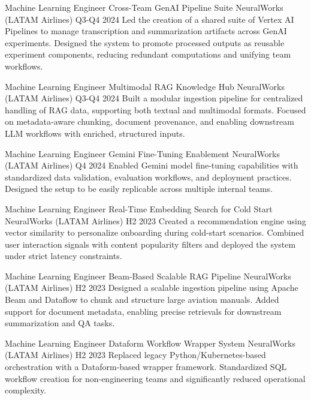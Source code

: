 \begin{cventries}


    \cventry
    {Machine Learning Engineer}
    {Cross-Team GenAI Pipeline Suite}
    {NeuralWorks (LATAM Airlines)}
    {Q3-Q4 2024}
    {Led the creation of a shared suite of Vertex AI Pipelines to manage transcription and summarization artifacts across GenAI experiments. Designed the system to promote processed outputs as reusable experiment components, reducing redundant computations and unifying team workflows.}

    \cventry
    {Machine Learning Engineer}
    {Multimodal RAG Knowledge Hub}
    {NeuralWorks (LATAM Airlines)}
    {Q3-Q4 2024}
    {Built a modular ingestion pipeline for centralized handling of RAG data, supporting both textual and multimodal formats. Focused on metadata-aware chunking, document provenance, and enabling downstream LLM workflows with enriched, structured inputs.}

    \cventry
    {Machine Learning Engineer}
    {Gemini Fine-Tuning Enablement}
    {NeuralWorks (LATAM Airlines)}
    {Q4 2024}
    {Enabled Gemini model fine-tuning capabilities with standardized data validation, evaluation workflows, and deployment practices. Designed the setup to be easily replicable across multiple internal teams.}

    \cventry
    {Machine Learning Engineer}
    {Real-Time Embedding Search for Cold Start}
    {NeuralWorks (LATAM Airlines)}
    {H2 2023}
    {Created a recommendation engine using vector similarity to personalize onboarding during cold-start scenarios. Combined user interaction signals with content popularity filters and deployed the system under strict latency constraints.}

    \cventry
    {Machine Learning Engineer}
    {Beam-Based Scalable RAG Pipeline}
    {NeuralWorks (LATAM Airlines)}
    {H2 2023}
    {Designed a scalable ingestion pipeline using Apache Beam and Dataflow to chunk and structure large aviation manuals. Added support for document metadata, enabling precise retrievals for downstream summarization and QA tasks.}

    \cventry
    {Machine Learning Engineer}
    {Dataform Workflow Wrapper System}
    {NeuralWorks (LATAM Airlines)}
    {H2 2023}
    {Replaced legacy Python/Kubernetes-based orchestration with a Dataform-based wrapper framework. Standardized SQL workflow creation for non-engineering teams and significantly reduced operational complexity.}

\end{cventries}